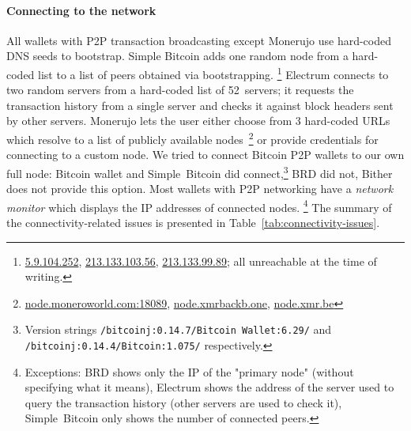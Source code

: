 \paragraph{Connecting to the network}
All wallets with P2P transaction broadcasting except Monerujo use hard-coded DNS seeds to bootstrap.
Simple Bitcoin adds one random node from a hard-coded list to a list of peers obtained via bootstrapping.
\footnote{\url{5.9.104.252}, \url{213.133.103.56}, \url{213.133.99.89}; all unreachable at the time of writing.}
Electrum connects to two random servers from a hard-coded list of 52~servers; it requests the transaction history from a single server and checks it against block headers sent by other servers.
Monerujo lets the user either choose from 3 hard-coded URLs which resolve to a list of publicly available nodes~\footnote{\url{node.moneroworld.com:18089}, \url{node.xmrbackb.one}, \url{node.xmr.be}} or provide credentials for connecting to a custom node.
We tried to connect Bitcoin P2P wallets to our own full node: Bitcoin wallet and Simple~Bitcoin did connect,\footnote{Version strings \texttt{/bitcoinj:0.14.7/Bitcoin Wallet:6.29/} and \texttt{/bitcoinj:0.14.4/Bitcoin:1.075/} respectively.} BRD did not, Bither does not provide this option.
Most wallets with P2P networking have a \textit{network monitor} which displays the IP addresses of connected nodes.
\footnote{Exceptions: BRD shows only the IP of the "primary node" (without specifying what it means), Electrum shows the address of the server used to query the transaction history (other servers are used to check it), Simple~Bitcoin only shows the number of connected peers.}
The summary of the connectivity-related issues is presented in Table~\ref{tab:connectivity-issues}.

